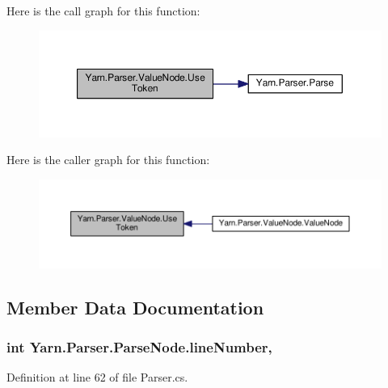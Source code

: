 Here is the call graph for this function\-:
\nopagebreak
\begin{figure}[H]
\begin{center}
\leavevmode
\includegraphics[width=350pt]{a00190_a7be6a979ee21b2d07ce541fb9c5b52df_cgraph}
\end{center}
\end{figure}




Here is the caller graph for this function\-:
\nopagebreak
\begin{figure}[H]
\begin{center}
\leavevmode
\includegraphics[width=350pt]{a00190_a7be6a979ee21b2d07ce541fb9c5b52df_icgraph}
\end{center}
\end{figure}




\subsection{Member Data Documentation}
\hypertarget{a00150_a18b493382de0fde5b4299c1bd2250075}{
\subsubsection[{line\-Number}]{\setlength{\rightskip}{0pt plus 5cm}int Yarn.\-Parser.\-Parse\-Node.\-line\-Number\hspace{0.3cm}{\ttfamily [package]}, {\ttfamily [inherited]}}}\label{a00150_a18b493382de0fde5b4299c1bd2250075}


Definition at line 62 of file Parser.\-cs.



